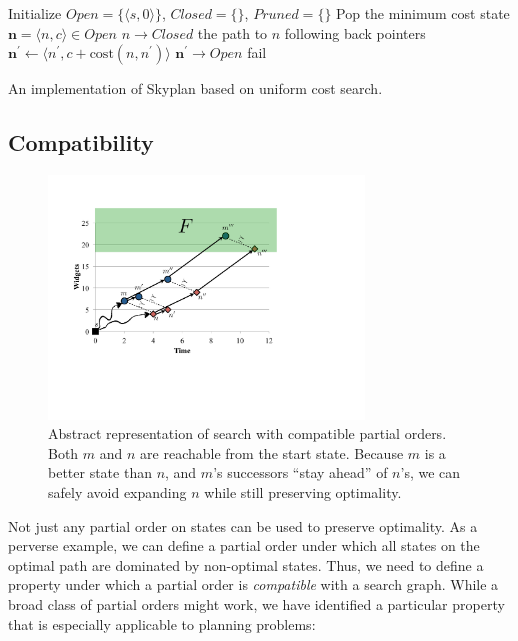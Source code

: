 \documentclass[letterpaper]{article}
\theoremstyle{plain} \newtheorem{theorem}{Theorem} \newtheorem{proposition}{Proposition} \newtheorem{lemma}{Lemma}
\theoremstyle{definition} \newtheorem{definition}{Definition} \newtheorem{conjecture}{Conjecture} \newtheorem*{example}{Example}
\theoremstyle{remark} \newtheorem*{remark}{Remark} \newtheorem*{note}{Note} \newtheorem{case}{Case}
\begin{document}
\begin{algorithm}
  \begin{algorithmic}[1]
    \State Initialize $Open=\{\langle s,0\rangle\}$, $Closed=\{\}$, $Pruned=\{\}$
    \State Pop the minimum cost state $\mathbf{n} = \langle n,c\rangle\in Open$
      \State $n\rightarrow Closed$
        \State \Return the path to $n$ following back pointers
      \EndIf
        \State $\mathbf{n^\prime} \gets \langle n^\prime,c+\mathrm{cost}(n,n^\prime)\rangle$
          \State $\mathbf{n^\prime} \rightarrow Open$
        \EndFor
      \EndIf
    \EndWhile
    \State fail
  \EndProcedure
  \end{algorithmic}
\caption{An implementation of Skyplan based on uniform cost search.  }
\label{alg:skyplan}
\end{algorithm}

\subsection{Compatibility}
\begin{figure}
	\begin{center}
	\includegraphics[width=3.3in]{compatibility-2.pdf}
\end{center}
  \vspace{-.2in}
  \caption{Abstract representation of search with compatible partial
  orders. Both $m$ and $n$ are reachable from the start state.
  Because $m$ is a better state than $n$, and $m$'s successors
  ``stay ahead'' of $n$'s, we can safely avoid expanding $n$ while
  still preserving optimality.}
\end{figure}

Not just any partial order on states can be used to preserve optimality. As a perverse
example, we can define a partial order under which all states on the optimal path
are dominated by non-optimal states. Thus, we need to define a property
under which a partial order is \textit{compatible} with a search graph. While
a broad class of partial orders might work, we have identified a particular 
property that is especially applicable to planning problems:
\end{document}
